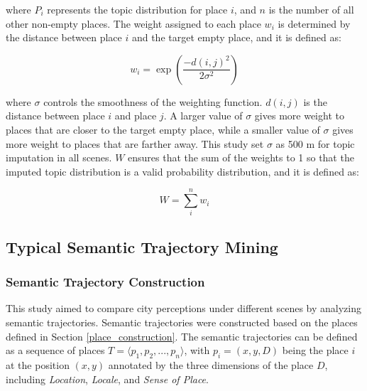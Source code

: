 \documentclass{article}
\theoremstyle{remark}
\begin{document}
where $P_{i}$ represents the topic distribution for place $i$, and $n$ is the number of all other non-empty places. The weight assigned to each place $w_{i}$ is determined by the distance between place $i$ and the target empty place, and it is defined as:

\begin{equation} \label{eq:topic_imputation_w_i}
    w_{i} = \exp(\frac{-d(i,j)^2}{2\sigma^2})
\end{equation}

where $\sigma$ controls the smoothness of the weighting function. $d(i,j)$ is the distance between place $i$ and place $j$. A larger value of $\sigma$ gives more weight to places that are closer to the target empty place, while a smaller value of $\sigma$ gives more weight to places that are farther away. This study set $\sigma$ as 500 m for topic imputation in all scenes. $W$ ensures that the sum of the weights to 1 so that the imputed topic distribution is a valid probability distribution, and it is defined as:

\begin{equation} \label{eq:topic_imputation_W}
    W = \sum_{i}^{n}w_{i}
\end{equation}

\subsection{Typical Semantic Trajectory Mining} \label{typical_semantic_trajectory_mining}

\subsubsection{Semantic Trajectory Construction}
This study aimed to compare city perceptions under different scenes by analyzing semantic trajectories. Semantic trajectories were constructed based on the places defined in Section \ref{place_construction}. The semantic trajectories can be defined as a sequence of places $T = \langle p_{1}, p_{2}, ..., p_{n} \rangle$, with $p_{i} = (x,y,D)$ being the place $i$ at the position $(x,y)$ annotated by the three dimensions of the place $D$, including \textit{Location}, \textit{Locale}, and \textit{Sense of Place}.
\end{document}

